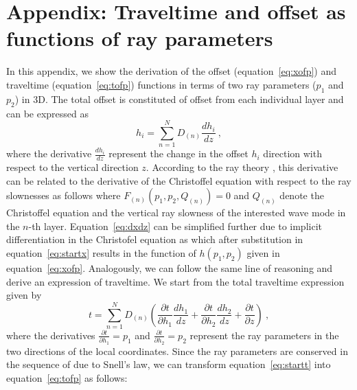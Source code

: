 \appendix
\section{Appendix: Traveltime and offset as functions of ray parameters}
In this appendix, we show the derivation of the offset (equation~\ref{eq:xofp}) and traveltime (equation~\ref{eq:tofp}) functions in terms of two ray parameters ($p_1$ and $p_2$) in 3D.
The total offset is constituted of offset  from each individual layer and can be expressed as
\begin{equation}
\label{eq:startx}
h_i = \sum\limits^N_{n=1} D_{(n)} \frac{dh_i}{dz}~,
\end{equation}
where the derivative $\frac{dh_i}{dz}$ represent the change in the offset $h_i$ direction with respect to the vertical direction $z$. According to the ray theory \cite[]{cerveny}, this derivative can be related to the derivative of the Christoffel equation with respect to the ray slownesses as follows
where $F_{(n)}(p_1, p_2, Q_{(n)}) = 0 $ and $Q_{(n)}$ denote the Christoffel equation and the vertical ray slowness of the interested wave mode in the $n$-th layer. Equation~\ref{eq:dxdz} can be simplified further due to implicit differentiation in the Christofel equation as
which after substitution in equation~\ref{eq:startx} results in the function of $h(p_1,p_2)$ given in equation~\ref{eq:xofp}. Analogously, we can follow the same line of reasoning and derive an expression of traveltime. We start from the total traveltime expression given by
\begin{equation}
\label{eq:startt}
t = \sum\limits^N_{n=1} D_{(n)} \left( \frac{\partial t}{\partial h_1}\frac{dh_1}{dz}+ \frac{\partial t}{\partial h_2}\frac{dh_2}{dz} + \frac{\partial t}{\partial z} \right)~,
\end{equation}
where the derivatives $\frac{\partial t}{\partial h_1} = p_1$ and $\frac{\partial t}{\partial h_2} = p_2$ represent the ray parameters in the two directions of the local coordinates. Since the ray parameters are conserved in the sequence of  due to Snell's law, we can  transform equation~\ref{eq:startt} into equation~\ref{eq:tofp} as follows:
